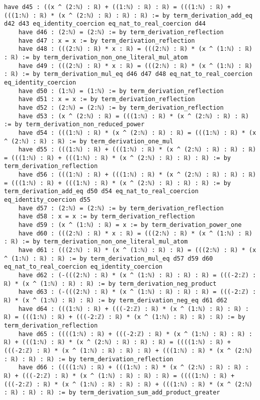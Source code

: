 \documentclass{article}
\begin{document}
\begin{tcolorbox}[colback=white!10, width=\linewidth]
\begin{lstlisting}[language=Lean4]
    have d45 : ((x ^ (2:ℕ) : ℝ) + ((1:ℕ) : ℝ) : ℝ) = (((1:ℕ) : ℝ) + (((1:ℕ) : ℝ) * (x ^ (2:ℕ) : ℝ) : ℝ) : ℝ) := by term_derivation_add_eq d42 d43 eq_identity_coercion eq_nat_to_real_coercion d44
    have d46 : (2:ℕ) = (2:ℕ) := by term_derivation_reflection
    have d47 : x = x := by term_derivation_reflection
    have d48 : (((2:ℕ) : ℝ) * x : ℝ) = (((2:ℕ) : ℝ) * (x ^ (1:ℕ) : ℝ) : ℝ) := by term_derivation_non_one_literal_mul_atom
    have d49 : (((2:ℕ) : ℝ) * x : ℝ) = (((2:ℕ) : ℝ) * (x ^ (1:ℕ) : ℝ) : ℝ) := by term_derivation_mul_eq d46 d47 d48 eq_nat_to_real_coercion eq_identity_coercion
    have d50 : (1:ℕ) = (1:ℕ) := by term_derivation_reflection
    have d51 : x = x := by term_derivation_reflection
    have d52 : (2:ℕ) = (2:ℕ) := by term_derivation_reflection
    have d53 : (x ^ (2:ℕ) : ℝ) = (((1:ℕ) : ℝ) * (x ^ (2:ℕ) : ℝ) : ℝ) := by term_derivation_non_reduced_power
    have d54 : (((1:ℕ) : ℝ) * (x ^ (2:ℕ) : ℝ) : ℝ) = (((1:ℕ) : ℝ) * (x ^ (2:ℕ) : ℝ) : ℝ) := by term_derivation_one_mul
    have d55 : (((1:ℕ) : ℝ) + (((1:ℕ) : ℝ) * (x ^ (2:ℕ) : ℝ) : ℝ) : ℝ) = (((1:ℕ) : ℝ) + (((1:ℕ) : ℝ) * (x ^ (2:ℕ) : ℝ) : ℝ) : ℝ) := by term_derivation_reflection
    have d56 : (((1:ℕ) : ℝ) + (((1:ℕ) : ℝ) * (x ^ (2:ℕ) : ℝ) : ℝ) : ℝ) = (((1:ℕ) : ℝ) + (((1:ℕ) : ℝ) * (x ^ (2:ℕ) : ℝ) : ℝ) : ℝ) := by term_derivation_add_eq d50 d54 eq_nat_to_real_coercion eq_identity_coercion d55
    have d57 : (2:ℕ) = (2:ℕ) := by term_derivation_reflection
    have d58 : x = x := by term_derivation_reflection
    have d59 : (x ^ (1:ℕ) : ℝ) = x := by term_derivation_power_one
    have d60 : (((2:ℕ) : ℝ) * x : ℝ) = (((2:ℕ) : ℝ) * (x ^ (1:ℕ) : ℝ) : ℝ) := by term_derivation_non_one_literal_mul_atom
    have d61 : (((2:ℕ) : ℝ) * (x ^ (1:ℕ) : ℝ) : ℝ) = (((2:ℕ) : ℝ) * (x ^ (1:ℕ) : ℝ) : ℝ) := by term_derivation_mul_eq d57 d59 d60 eq_nat_to_real_coercion eq_identity_coercion
    have d62 : (-(((2:ℕ) : ℝ) * (x ^ (1:ℕ) : ℝ) : ℝ) : ℝ) = (((-2:ℤ) : ℝ) * (x ^ (1:ℕ) : ℝ) : ℝ) := by term_derivation_neg_product
    have d63 : (-(((2:ℕ) : ℝ) * (x ^ (1:ℕ) : ℝ) : ℝ) : ℝ) = (((-2:ℤ) : ℝ) * (x ^ (1:ℕ) : ℝ) : ℝ) := by term_derivation_neg_eq d61 d62
    have d64 : (((1:ℕ) : ℝ) + (((-2:ℤ) : ℝ) * (x ^ (1:ℕ) : ℝ) : ℝ) : ℝ) = (((1:ℕ) : ℝ) + (((-2:ℤ) : ℝ) * (x ^ (1:ℕ) : ℝ) : ℝ) : ℝ) := by term_derivation_reflection
    have d65 : ((((1:ℕ) : ℝ) + (((-2:ℤ) : ℝ) * (x ^ (1:ℕ) : ℝ) : ℝ) : ℝ) + (((1:ℕ) : ℝ) * (x ^ (2:ℕ) : ℝ) : ℝ) : ℝ) = ((((1:ℕ) : ℝ) + (((-2:ℤ) : ℝ) * (x ^ (1:ℕ) : ℝ) : ℝ) : ℝ) + (((1:ℕ) : ℝ) * (x ^ (2:ℕ) : ℝ) : ℝ) : ℝ) := by term_derivation_reflection
    have d66 : ((((1:ℕ) : ℝ) + (((1:ℕ) : ℝ) * (x ^ (2:ℕ) : ℝ) : ℝ) : ℝ) + (((-2:ℤ) : ℝ) * (x ^ (1:ℕ) : ℝ) : ℝ) : ℝ) = ((((1:ℕ) : ℝ) + (((-2:ℤ) : ℝ) * (x ^ (1:ℕ) : ℝ) : ℝ) : ℝ) + (((1:ℕ) : ℝ) * (x ^ (2:ℕ) : ℝ) : ℝ) : ℝ) := by term_derivation_sum_add_product_greater

\end{lstlisting}
\end{tcolorbox}
\end{document}
